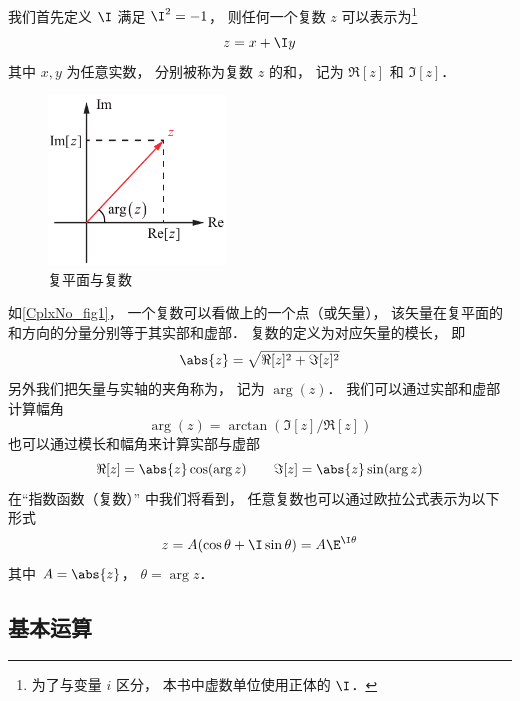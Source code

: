 
我们首先定义 $\I$ 满足 $\I^2 = -1$， 则任何一个复数 $z$ 可以表示为\footnote{为了与变量 $i$ 区分， 本书中虚数单位使用正体的 $\I$．}
\begin{equation}
z = x + \I y
\end{equation}
其中 $x,y$ 为任意实数， 分别被称为复数 $z$ 的和， 记为 $\Re[z]$ 和 $\Im[z]$．

\begin{figure}[ht]
\centering
\includegraphics[width=4.7cm]{./figures/CplxNo1.pdf}
\caption{复平面与复数} \label{CplxNo_fig1}
\end{figure}

如\autoref{CplxNo_fig1}， 一个复数可以看做上的一个点（或矢量）， 该矢量在复平面的和方向的分量分别等于其实部和虚部． 复数的定义为对应矢量的模长， 即
\begin{equation}
\abs{z} = \sqrt{\Re[z]^2 + \Im[z]^2}
\end{equation}
另外我们把矢量与实轴的夹角称为， 记为 $\arg(z)$． 我们可以通过实部和虚部计算幅角%
\begin{equation}
\arg(z) = \arctan(\Im[z]/\Re[z])
\end{equation}
也可以通过模长和幅角来计算实部与虚部
\begin{equation}
\Re[z] = \abs{z}\cos(\arg z) \qquad \Im[z] = \abs{z}\sin(\arg z)
\end{equation}
在“指数函数（复数）” 中我们将看到， 任意复数也可以通过欧拉公式表示为以下形式
\begin{equation}
z = A(\cos\theta + \I\sin\theta) = A\E^{\I\theta}
\end{equation}
其中 $A = \abs{z}$， $\theta = \arg z$．

\subsection{基本运算}
